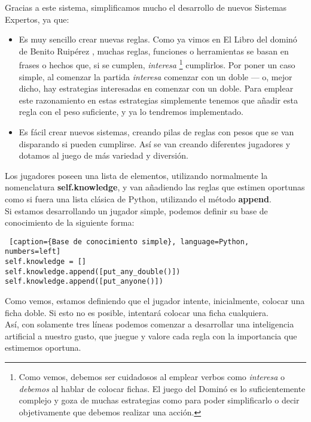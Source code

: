 Gracias a este sistema, simplificamos mucho el desarrollo de nuevos Sistemas Expertos, ya que:
\begin{itemize}
    \item Es muy sencillo crear nuevas reglas. Como ya vimos en El Libro del dominó de Benito Ruipérez \cite{mora90},
        muchas reglas, funciones o herramientas se basan en frases o hechos que, si se cumplen, \emph{interesa}
        \footnote{Como vemos, debemos ser cuidadosos al emplear verbos como \emph{interesa} o \emph{debemos} al hablar
        de colocar fichas. El juego del Dominó es lo suficientemente complejo y goza de muchas estrategias como para poder
        simplificarlo o decir objetivamente que debemos realizar una acción.} cumplirlos.
        Por poner un caso simple, al comenzar la partida \emph{interesa} comenzar con un doble --- o, mejor dicho, hay
        estrategias interesadas en comenzar con un doble. Para emplear este razonamiento en estas estrategias simplemente
        tenemos que añadir esta regla con el peso suficiente, y ya lo tendremos implementado.
    \item Es fácil crear nuevos sistemas, creando pilas de reglas con pesos que se van disparando si pueden cumplirse.
        Así se van creando diferentes jugadores y dotamos al juego de más variedad y diversión.
\end{itemize}

Los jugadores poseen una lista de elementos, utilizando normalmente la nomenclatura \textbf{self.knowledge}, y van
añadiendo las reglas que estimen oportunas como si fuera una lista clásica de Python, utilizando el método \textbf{append}. \\

Si estamos desarrollando un jugador simple, podemos definir su base de conocimiento de la siguiente forma:

\begin{lstlisting} [caption={Base de conocimiento simple}, language=Python, numbers=left]
self.knowledge = []
self.knowledge.append([put_any_double()])
self.knowledge.append([put_anyone()])
\end{lstlisting}

Como vemos, estamos definiendo que el jugador intente, inicialmente, colocar una ficha doble. Si esto no es posible,
intentará colocar una ficha cualquiera. \\

Así, con solamente tres líneas podemos comenzar a desarrollar una inteligencia artificial a nuestro gusto, que juegue
y valore cada regla con la importancia que estimemos oportuna. \\

